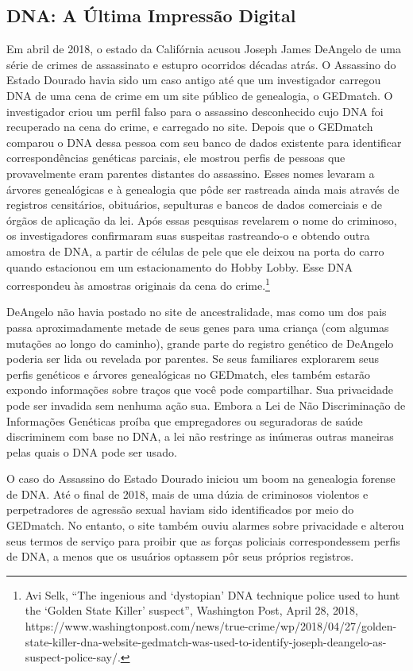 \documentclass{book}
\begin{document}
\subsection{DNA: A Última Impressão Digital}
\label{cap3:quem-pegadas-dna}
Em abril de 2018, o estado da Califórnia acusou Joseph James DeAngelo de uma
série de crimes de assassinato e estupro ocorridos décadas atrás. O Assassino
do Estado Dourado havia sido um caso antigo até que um investigador carregou
DNA de uma cena de crime em um site público de genealogia, o GEDmatch. O
investigador criou um perfil falso para o assassino desconhecido cujo DNA
foi recuperado na cena do crime, e carregado no site. Depois que o GEDmatch comparou o DNA dessa pessoa
com seu banco de dados existente para identificar correspondências genéticas
parciais, ele mostrou perfis de pessoas que provavelmente eram parentes
distantes do assassino. Esses nomes levaram a árvores genealógicas e à
genealogia que pôde ser rastreada ainda mais através de registros censitários,
obituários, sepulturas e bancos de dados comerciais e de órgãos de aplicação da
lei. Após essas pesquisas revelarem o nome do criminoso, os investigadores
confirmaram suas suspeitas rastreando-o e obtendo outra amostra de DNA, a
partir de células de pele que ele deixou na porta do carro quando estacionou
em um estacionamento do Hobby Lobby. Esse DNA correspondeu às amostras
originais da cena do crime.\footnote{Avi Selk, ``The ingenious and ‘dystopian’
DNA technique police used to hunt the ‘Golden State Killer’ suspect'',
Washington Post, April 28, 2018,
https://www.washingtonpost.com/news/true-crime/wp/2018/04/27/golden-state-killer-dna-website-gedmatch-was-used-to-identify-joseph-deangelo-as-suspect-police-say/.}

DeAngelo não havia postado no site de ancestralidade, mas como um dos pais passa
aproximadamente metade de seus genes para uma criança (com algumas mutações ao
longo do caminho), grande parte do registro genético de DeAngelo poderia ser
lida ou revelada por parentes. Se seus familiares explorarem seus perfis genéticos
e árvores genealógicas no GEDmatch, eles também estarão expondo informações sobre
traços que você pode compartilhar. Sua privacidade pode ser invadida sem nenhuma
ação sua. Embora a Lei de Não Discriminação de Informações Genéticas proíba que
empregadores ou seguradoras de saúde discriminem com base no DNA, a lei não
restringe as inúmeras outras maneiras pelas quais o DNA pode ser usado.

O caso do Assassino do Estado Dourado iniciou um boom na genealogia forense de DNA.
Até o final de 2018, mais de uma dúzia de criminosos violentos e perpetradores
de agressão sexual haviam sido identificados por meio do GEDmatch. No entanto, o
site também ouviu alarmes sobre privacidade e alterou seus termos de serviço para
proibir que as forças policiais correspondessem perfis de DNA, a menos que os
usuários optassem pôr seus próprios registros.
\end{document}
